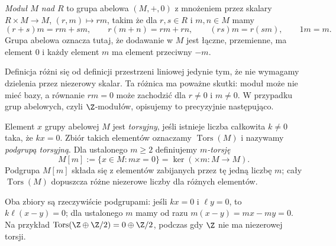 \begin{definicja}
\label{def:modul}
\emph{Moduł $M$ nad $R$} to grupa abelowa
$(M,+,0)$ z mnożeniem przez skalary
$R\times M\to M$, $(r,m)\mapsto rm$, takim że
dla $r,s\in R$ i $m,n\in M$ mamy
\[
 (r+s)m=rm+sm,\qquad r(m+n)=rm+rn,\qquad
 (rs)m=r(sm),\qquad 1m=m.
\]
Grupa abelowa oznacza tutaj, że dodawanie w $M$
jest łączne, przemienne, ma element $0$ i każdy
element $m$ ma element przeciwny $-m$.
\end{definicja}

Definicja różni się od definicji przestrzeni liniowej
jedynie tym, że nie wymagamy dzielenia przez
niezerowy skalar. Ta różnica ma poważne skutki:
moduł może nie mieć bazy, a równanie $rm=0$ może
zachodzić dla $r\ne0$ i $m\ne0$.
W przypadku grup abelowych, czyli $\Z$-modułów,
opisujemy to precyzyjnie następująco.

\begin{definicja}
\label{def:torsja}
Element $x$ grupy abelowej $M$ jest
\emph{torsyjny}, jeśli istnieje liczba całkowita
$k\ne0$ taka, że $kx=0$. Zbiór takich elementów
oznaczamy $\operatorname{Tors}(M)$ i nazywamy
\emph{podgrupą torsyjną}. Dla ustalonego $m\geq2$
definiujemy \emph{$m$-torsję}
\[
 M[m]:=\{x\in M:mx=0\}=\ker(\times m:M\to M).
\]
Podgrupa $M[m]$ składa się z elementów zabijanych
przez tę jedną liczbę $m$; cały
$\operatorname{Tors}(M)$ dopuszcza różne niezerowe
liczby dla różnych elementów.
\end{definicja}

Oba zbiory są rzeczywiście podgrupami: jeśli
$kx=0$ i $\ell y=0$, to $k\ell(x-y)=0$;
dla ustalonego $m$ mamy od razu
$m(x-y)=mx-my=0$. Na przykład
$\operatorname{Tors}(\Z\oplus\Z/2)
=0\oplus\Z/2$, podczas gdy $\Z$
nie ma niezerowej torsji.

